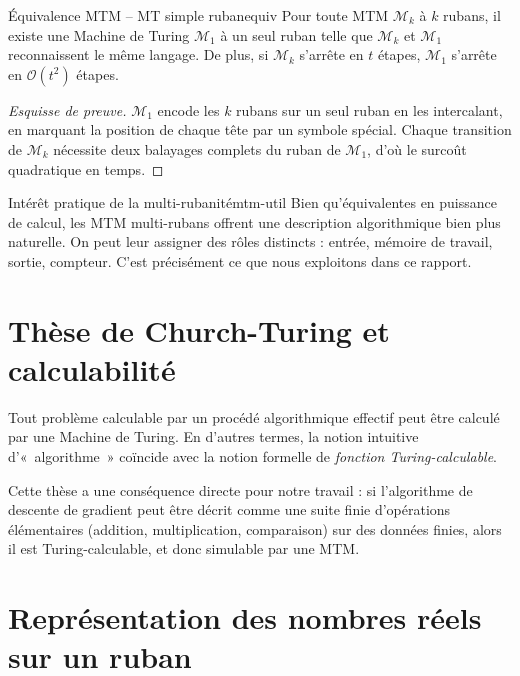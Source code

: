 \documentclass[12pt, a4paper, oneside]{report}
\newcommand{\mtm}{\mathcal{M}}
\begin{document}
\begin{thm}{Équivalence MTM -- MT simple ruban}{equiv}
  Pour toute MTM $\mtm_k$ à $k$ rubans, il existe une Machine de Turing $\mtm_1$ à un seul ruban telle que $\mtm_k$ et $\mtm_1$ reconnaissent le même langage. De plus, si $\mtm_k$ s'arrête en $t$ étapes, $\mtm_1$ s'arrête en $\mathcal{O}(t^2)$ étapes.
\end{thm}

\begin{proof}[Esquisse de preuve]
  $\mtm_1$ encode les $k$ rubans sur un seul ruban en les intercalant, en marquant la position de chaque tête par un symbole spécial. Chaque transition de $\mtm_k$ nécessite deux balayages complets du ruban de $\mtm_1$, d'où le surcoût quadratique en temps.
\end{proof}

\begin{rmk}{Intérêt pratique de la multi-rubanité}{mtm-util}
  Bien qu'équivalentes en puissance de calcul, les MTM multi-rubans offrent une description algorithmique bien plus naturelle. On peut leur assigner des rôles distincts : entrée, mémoire de travail, sortie, compteur. C'est précisément ce que nous exploitons dans ce rapport.
\end{rmk}

\section{Thèse de Church-Turing et calculabilité}

\begin{tcolorbox}[
  colback=red!4, colframe=thmcolor,
  fonttitle=\bfseries, title={Thèse de Church-Turing},
  sharp corners, left=8pt
]
  Tout problème calculable par un procédé algorithmique effectif peut être calculé par une Machine de Turing. En d'autres termes, la notion intuitive d'«~algorithme~» coïncide avec la notion formelle de \emph{fonction Turing-calculable}.
\end{tcolorbox}

Cette thèse a une conséquence directe pour notre travail : si l'algorithme de descente de gradient peut être décrit comme une suite finie d'opérations élémentaires (addition, multiplication, comparaison) sur des données finies, alors il est Turing-calculable, et donc simulable par une MTM.

\section{Représentation des nombres réels sur un ruban}
\end{document}
